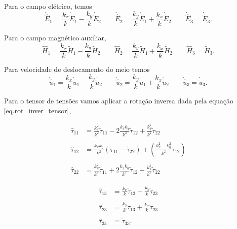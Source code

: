 Para o campo el\'etrico, temos
\begin{equation*}
\dot{\hat{E}}_1=\frac{k_x}{k}\dot{\tilde{E}}_1-\frac{k_y}{k}\dot{\tilde{E}}_2\qquad
\dot{\hat{E}}_2=\frac{k_y}{k}\dot{\tilde{E}}_1+\frac{k_x}{k}\dot{\tilde{E}}_2\qquad
\dot{\hat{E}}_3=\dot{\tilde{E}}_3.
\end{equation*}


Para o campo magn\'etico auxiliar,
\begin{equation*}
\dot{\hat{H}}_1=\frac{k_x}{k}\dot{\tilde{H}}_1-\frac{k_y}{k}\dot{\tilde{H}}_2\qquad
\dot{\hat{H}}_2=\frac{k_y}{k}\dot{\tilde{H}}_1+\frac{k_x}{k}\dot{\tilde{H}}_2\qquad
\dot{\hat{H}}_3=\dot{\tilde{H}}_3.
\end{equation*}


Para velocidade de deslocamento do meio temos
\begin{equation*}
\dot{\hat{u}}_1=\frac{k_x}{k}\dot{\tilde{u}}_1-\frac{k_y}{k}\dot{\tilde{u}}_2\qquad
\dot{\hat{u}}_2=\frac{k_y}{k}\dot{\tilde{u}}_1+\frac{k_x}{k}\dot{\tilde{u}}_2\qquad
\dot{\hat{u}}_3=\dot{\tilde{u}}_3.
\end{equation*}

Para o tensor de tens\~oes vamos aplicar a rota\c{c}\~ao inversa dada pela equa\c{c}\~ao \ref{eq.rot_inver_tensor},\\
\begin{minipage}{.5\textwidth}
\begin{align*}
\hat{\tau}_{11}&=\frac{k_x^2}{k^2}\tilde{\tau}_{11}-2\frac{k_xk_y}{k^2}\tilde{\tau}_{12}+\frac{k_y^2}{k^2}\tilde{\tau}_{22}\\\\
\hat{\tau}_{12}&=\frac{k_xk_y}{k^2}(\tilde{\tau}_{11}-\tilde{\tau}_{22})+\left(\frac{k_x^2-k_y^2}{k^2}\tilde{\tau}_{12}\right)\\\\
\hat{\tau}_{22}&=\frac{k_y^2}{k^2}\tilde{\tau}_{11}+2\frac{k_xk_y}{k^2}\tilde{\tau}_{12}+\frac{k_x^2}{k^2}\tilde{\tau}_{22}
\end{align*}
\end{minipage}
\begin{minipage}{.5\textwidth}
\begin{align*}
\hat{\tau}_{13}&=\frac{k_x}{k}\tilde{\tau}_{13}-\frac{k_y}{k}\tilde{\tau}_{23}\\\\
\hat{\tau}_{23}&=\frac{k_y}{k}\tilde{\tau}_{13}+\frac{k_x}{k}\tilde{\tau}_{23}\\\\
\hat{\tau}_{33}&=\tilde{\tau}_{33}.
\end{align*}
\end{minipage}\\


